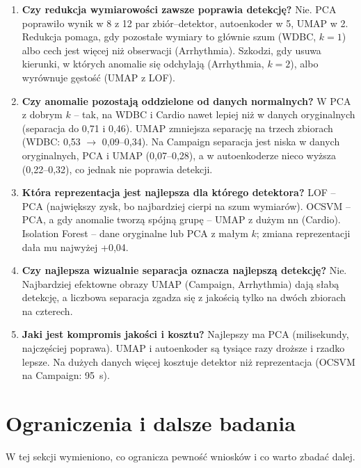 \documentclass[11pt,a4paper]{article}
\begin{document}
\begin{enumerate}[label=\alph*)]
  \item \textbf{Czy redukcja wymiarowości zawsze poprawia detekcję?} Nie.
  PCA poprawiło wynik w 8 z 12 par zbiór--detektor, autoenkoder w 5, UMAP
  w 2. Redukcja pomaga, gdy pozostałe wymiary to głównie szum (WDBC, $k=1$)
  albo cech jest więcej niż obserwacji (Arrhythmia). Szkodzi, gdy usuwa
  kierunki, w których anomalie się odchylają (Arrhythmia, $k=2$), albo
  wyrównuje gęstość (UMAP z LOF).
  \item \textbf{Czy anomalie pozostają oddzielone od danych normalnych?}
  W PCA z dobrym $k$ -- tak, na WDBC i Cardio nawet lepiej niż w danych
  oryginalnych (separacja do 0,71 i 0,46). UMAP zmniejsza separację na
  trzech zbiorach (WDBC: 0,53 $\rightarrow$ 0,09--0,34). Na Campaign
  separacja jest niska w danych oryginalnych, PCA i UMAP (0,07--0,28),
  a w autoenkoderze nieco wyższa (0,22--0,32), co jednak nie poprawia
  detekcji.
  \item \textbf{Która reprezentacja jest najlepsza dla którego detektora?}
  LOF -- PCA (największy zysk, bo najbardziej cierpi na szum wymiarów).
  OCSVM -- PCA, a gdy anomalie tworzą spójną grupę -- UMAP z dużym nn
  (Cardio). Isolation Forest -- dane oryginalne lub PCA z małym $k$; zmiana
  reprezentacji dała mu najwyżej +0,04.
  \item \textbf{Czy najlepsza wizualnie separacja oznacza najlepszą
  detekcję?} Nie. Najbardziej efektowne obrazy UMAP (Campaign, Arrhythmia)
  dają słabą detekcję, a liczbowa separacja zgadza się z jakością tylko na
  dwóch zbiorach na czterech.
  \item \textbf{Jaki jest kompromis jakości i kosztu?} Najlepszy ma PCA
  (milisekundy, najczęściej poprawa). UMAP i autoenkoder są tysiące razy
  droższe i rzadko lepsze. Na dużych danych więcej kosztuje detektor niż
  reprezentacja (OCSVM na Campaign: 95~s).
\end{enumerate}

\FloatBarrier
\section{Ograniczenia i dalsze badania}

W tej sekcji wymieniono, co ogranicza pewność wniosków i co warto zbadać
dalej.
\end{document}
